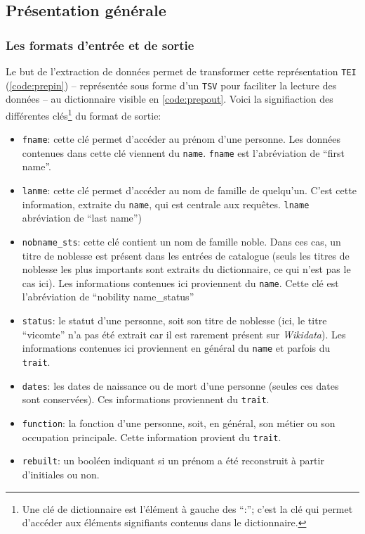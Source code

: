\documentclass[a4paper, 12pt, twoside]{book}
\newcommand{\tei}{\texttt{TEI}}
\newcommand{\tsv}{\texttt{TSV}}
\newcommand{\tname}{\texttt{name}}
\newcommand{\ttrait}{\texttt{trait}}
\newcommand{\wkd}{\textit{Wikidata}}
\begin{document}
\subsection{Présentation générale}
\subsubsection{Les formats d'entrée et de sortie}
Le but de l'extraction de données permet de transformer cette représentation \tei{} (\ref{code:prepin}) -- représentée sous forme d'un \tsv{} pour faciliter la lecture des données -- au \gls{dictionnaire} visible en \ref{code:prepout}. Voici la signifiaction des différentes clés\footnote{Une clé de \gls{dictionnaire} est l'élément à gauche des \enquote{:}; c'est la clé qui permet d'accéder aux éléments signifiants contenus dans le dictionnaire.} du format de sortie:
\begin{itemize}
	\item \texttt{fname}: cette clé permet d'accéder au prénom d'une personne. Les données contenues dans cette clé viennent du \tname{}. \texttt{fname} est l'abréviation de \enquote{first name}.
	\item \texttt{lanme}: cette clé permet d'accéder au nom de famille de quelqu'un. C'est cette information, extraite du \tname{}, qui est centrale aux requêtes. \texttt{lname} abréviation de \enquote{last name})
	\item \texttt{nobname\_sts}: cette clé contient un nom de famille noble. Dans ces cas, un titre de noblesse est présent dans les entrées de catalogue (seuls les titres de noblesse les plus importants sont extraits du dictionnaire, ce qui n'est pas le cas ici). Les informations contenues ici proviennent du \tname{}. Cette clé est l'abréviation de \enquote{nobility name\_status}
	\item \texttt{status}: le statut d'une personne, soit son titre de noblesse (ici, le titre \enquote{vicomte} n'a pas été extrait car il est rarement présent sur \wkd{}). Les informations contenues ici proviennent en général du \tname{} et parfois du \ttrait{}.
	\item \texttt{dates}: les dates de naissance ou de mort d'une personne (seules ces dates sont conservées). Ces informations proviennent du \ttrait{}.
	\item \texttt{function}: la fonction d'une personne, soit, en général, son métier ou son occupation principale. Cette information provient du \ttrait{}.
	\item \texttt{rebuilt}: un booléen indiquant si un prénom a été reconstruit à partir d'initiales ou non.
\end{itemize}
\end{document}
